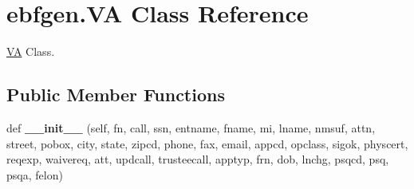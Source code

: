 \hypertarget{classebfgen_1_1VA}{}\section{ebfgen.\+VA Class Reference}
\label{classebfgen_1_1VA}


\hyperlink{classebfgen_1_1VA}{VA} Class.  


\subsection*{Public Member Functions}
\begin{DoxyCompactItemize}
\item 
\mbox{\label{classebfgen_1_1VA_a47a6dc2f120bc59eed863399f6d57907}} 
def {\bfseries \+\_\+\+\_\+init\+\_\+\+\_\+} (self, fn, call, ssn, entname, fname, mi, lname, nmsuf, attn, street, pobox, city, state, zipcd, phone, fax, email, appcd, opclass, sigok, physcert, reqexp, waivereq, att, updcall, trusteecall, apptyp, frn, dob, lnchg, psqcd, psq, psqa, felon)
\end{DoxyCompactItemize}
